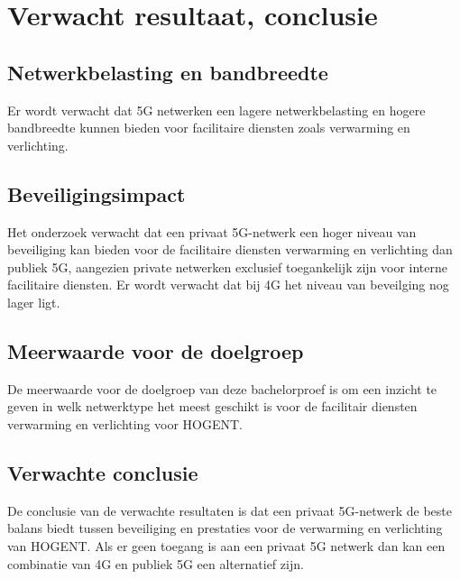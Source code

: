 \section{Verwacht resultaat, conclusie}%
\label{sec:verwachte_resultaten}

%
%

\subsection{Netwerkbelasting en bandbreedte}
Er wordt verwacht dat 5G netwerken een lagere netwerkbelasting en hogere bandbreedte kunnen bieden voor facilitaire diensten zoals verwarming en verlichting. 

\subsection{Beveiligingsimpact}
Het onderzoek verwacht dat een privaat 5G-netwerk een hoger niveau van beveiliging kan bieden voor de facilitaire diensten verwarming en verlichting dan publiek 5G, aangezien private netwerken exclusief toegankelijk zijn voor interne facilitaire diensten. Er wordt verwacht dat bij 4G het niveau van beveilging nog lager ligt.

\subsection{Meerwaarde voor de doelgroep}
De meerwaarde voor de doelgroep van deze bachelorproef is om een inzicht te geven in welk netwerktype het meest geschikt is voor de facilitair diensten verwarming en verlichting voor HOGENT. 

\subsection{Verwachte conclusie}
De conclusie van de verwachte resultaten is dat een privaat 5G-netwerk de beste balans biedt tussen beveiliging en prestaties voor de verwarming en verlichting van HOGENT. Als er geen toegang is aan een privaat 5G netwerk dan kan een combinatie van 4G en publiek 5G een alternatief zijn.

